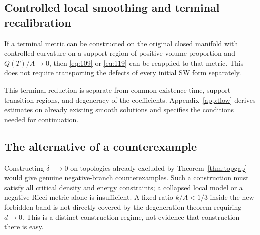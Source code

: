 \documentclass[a4paper,11pt]{article}
\numberwithin{equation}{section}
\theoremstyle{definition}
\begin{document}
\subsection{Controlled local smoothing and terminal recalibration}
If a terminal metric can be constructed on the original closed manifold with controlled curvature on a support region of positive volume proportion and $Q(T)/A\to0$, then \eqref{eq:109} or \eqref{eq:119} can be reapplied to that metric. This does not require transporting the defects of every initial SW form separately.

This terminal reduction is separate from common existence time, support-transition regions, and degeneracy of the coefficients. Appendix~\ref{app:flow} derives estimates on already existing smooth solutions and specifies the conditions needed for continuation.

\subsection{The alternative of a counterexample}
Constructing $\delta_-\to0$ on topologies already excluded by Theorem~\ref{thm:topgap} would give genuine negative-branch counterexamples. Such a construction must satisfy all critical density and energy constraints; a collapsed local model or a negative-Ricci metric alone is insufficient. A fixed ratio $k/A<1/3$ inside the new forbidden band is not directly covered by the degeneration theorem requiring $d\to0$. This is a distinct construction regime, not evidence that construction there is easy.
\end{document}
